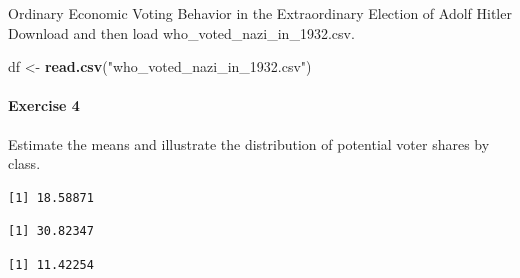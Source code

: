 \documentclass[]{article}
\newenvironment{Shaded}{\begin{snugshade}}{\end{snugshade}}
\newcommand{\KeywordTok}[1]{\textcolor[rgb]{0.13,0.29,0.53}{\textbf{#1}}}
\newcommand{\StringTok}[1]{\textcolor[rgb]{0.31,0.60,0.02}{#1}}
\newcommand{\CommentTok}[1]{\textcolor[rgb]{0.56,0.35,0.01}{\textit{#1}}}
\newcommand{\OperatorTok}[1]{\textcolor[rgb]{0.81,0.36,0.00}{\textbf{#1}}}
\newcommand{\NormalTok}[1]{#1}
\let\oldparagraph\paragraph
\renewcommand{\paragraph}[1]{\oldparagraph{#1}\mbox{}}
\theoremstyle{definition}
\theoremstyle{definition}
\theoremstyle{definition}
\theoremstyle{remark}
\begin{document}
Ordinary Economic Voting Behavior in the Extraordinary Election of Adolf
Hitler Download and then load who\_voted\_nazi\_in\_1932.csv.

\begin{Shaded}
\begin{Highlighting}[]
\NormalTok{df <-}\StringTok{ }\KeywordTok{read.csv}\NormalTok{(}\StringTok{"who_voted_nazi_in_1932.csv"}\NormalTok{)}
\end{Highlighting}
\end{Shaded}

\paragraph{Exercise 4}\label{exercise-4-4}

Estimate the means and illustrate the distribution of potential voter
shares by class.

\begin{Shaded}
\end{Shaded}

\begin{verbatim}
[1] 18.58871
\end{verbatim}

\begin{Shaded}
\end{Shaded}

\begin{verbatim}
[1] 30.82347
\end{verbatim}

\begin{Shaded}
\end{Shaded}

\begin{verbatim}
[1] 11.42254
\end{verbatim}

\begin{Shaded}
\end{Shaded}
\end{document}
